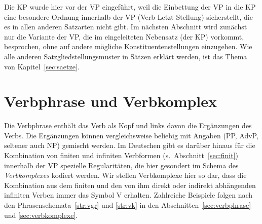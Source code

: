 Die KP wurde hier vor der VP eingeführt, weil die Einbettung der VP in die KP eine besondere Ordnung innerhalb der VP (Verb-Letzt-Stellung) sicherstellt, die es in allen anderen Satzarten nicht gibt.
Im nächsten Abschnitt wird zunächst nur die Variante der VP, die im eingeleiteten Nebensatz (der KP) vorkommt, besprochen, ohne auf andere mögliche Konstituentenstellungen einzugehen.
Wie alle anderen Satzgliedstellungsmuster in Sätzen erklärt werden, ist das Thema von Kapitel~\ref{sec:saetze}.




\section{Verbphrase und Verbkomplex}

\label{sec:vgr}

Die Verbphrase enthält das Verb als Kopf und links davon die Ergänzungen des Verbs.
Die Ergänzungen können vergleichsweise beliebig mit Angaben (PP, AdvP, seltener auch NP) gemischt werden.
Im Deutschen gibt es darüber hinaus für die Kombination von finiten und infiniten Verbformen (s.\ Abschnitt~\ref{sec:finit}) innerhalb der VP spezielle Regularitäten, die hier gesondert im Schema des \textit{Verbkomplexes} kodiert werden.
Wir stellen Verbkomplexe hier so dar, dass die Kombination aus dem finiten und den von ihm direkt oder indirekt abhängenden infiniten Verben immer das Symbol V erhalten.
Zahlreiche Beispiele folgen nach den Phrasenschemata~\ref{str:vgr} und \ref{str:vk} in den Abschnitten~\ref{sec:verbphrase} und \ref{sec:verbkomplexe}.





